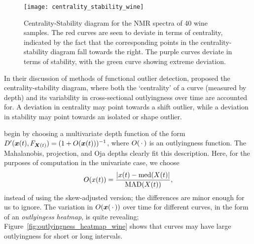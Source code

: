 \begin{figure}
    \centering
    \texttt{[image: centrality\_stability\_wine]}
    \caption{
        Centrality-Stability diagram for the NMR spectra of 40 wine samples.
        The red curves are seen to deviate in terms of centrality, indicated
        by the fact that the corresponding points in the centrality-stability
        diagram fall towards the right.
        The purple curves deviate in terms of stability, with the green curve
        showing extreme deviation.
    }
    \label{fig:centrality_stability_wine}
\end{figure}

In their discussion of methods of functional outlier detection,
\textcite{hubert-rousseeuw-segaert-2015} proposed the centrality-stability
diagram, where both the `centrality' of a curve (measured by depth) and its
variability in cross-sectional outlyingness over time are accounted for.
A deviation in centrality may point towards a shift outlier, while a deviation
in stability may point towards an isolated or shape outlier.

\textcite{hubert-rousseeuw-segaert-2015} begin by choosing a multivariate
depth function of the form $D'(\bm{x}(t), F_{\bm{X}(t)}) = (1 + O(\bm{x}(t)))^{-1}$,
where $O(\,\cdot\,)$ is an outlyingness function.
The Mahalanobis, projection, and Oja depths clearly fit this description.
Here, for the purposes of computation in the univariate case, we choose
\begin{equation}
    O(x(t)) = \frac{|x(t) - \operatorname{med}(X(t)|}{\operatorname{MAD}(X(t))},
\end{equation}
instead of using the skew-adjusted version; the differences are minor enough
for us to ignore.
The variation in $O(\bm{x}(\,\cdot\,))$ over time for different curves, in the form
of an \emph{outlyingess heatmap}, is quite revealing;
Figure~\ref{fig:outlyingness_heatmap_wine} shows that curves may have large
outlyingness for short or long intervals.

